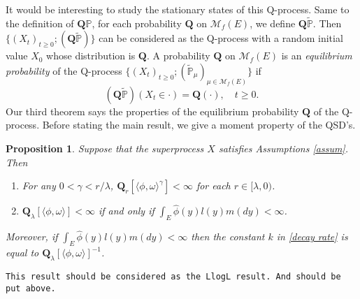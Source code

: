 \documentclass[12pt,a4paper]{amsart}
\numberwithin{equation}{section}
\theoremstyle{plain}
\newtheorem{prop}[thm]{Proposition}
\theoremstyle{definition}
\theoremstyle{remark}
\begin{document}
It would be interesting to study the stationary states of this Q-process.  Same to the definition of $\mathbf Q\mathbb P$, for each probability $\mathbf Q$ on $\mathcal M_f(E)$, we define $\mathbf Q\widetilde{\mathbb P}$.  Then $\{(X_t)_{t\geq 0}; (\mathbf Q\widetilde{\mathbb P})\}$ can be considered as the Q-process with a random initial value $X_0$ whose distribution is $\mathbf Q$.  A probability $\mathbf Q$ on $\mathcal M_f(E)$ is an \emph{equilibrium probability} of the Q-process $\{(X_t)_{t\geq 0}; (\widetilde{\mathbb P}_\mu)_{\mu\in\mathcal M_f(E)}\}$ if
\[
	(\mathbf Q\widetilde{\mathbb P})(X_t \in \cdot ) =\mathbf Q(\cdot),	\quad t\geq 0.
\]
Our third theorem says the properties of the equilibrium probability $\mathbf Q$ of the Q-process.  Before stating the main result, we give a moment property of the QSD's.
\begin{prop}\label{prop: exp prop}
	Suppose that the superprocess $X$ satisfies Assumptions \ref{assum}.  Then
\begin{enumerate}
\item  For any $0<\gamma<r/\lambda$,
	$\mathbf Q_r[\langle\phi,\omega\rangle^\gamma]<\infty$ for each $r \in [\lambda, 0)$.
\item
	$\mathbf Q_\lambda[\langle\phi,\omega\rangle] < \infty$ if and only if $\int_E \widehat\phi(y)l(y)m(dy)<\infty$.
\end{enumerate}
	Moreover, if $\int_E \widehat\phi(y)l(y)m(dy)<\infty$ then the constant $k$ in \eqref{decay rate} is equal to $\mathbf Q_\lambda[\langle\phi,\omega\rangle]^{-1}$.
\end{prop}

{\tt This result should be considered as the LlogL result. And should be put above.}
\end{document}
